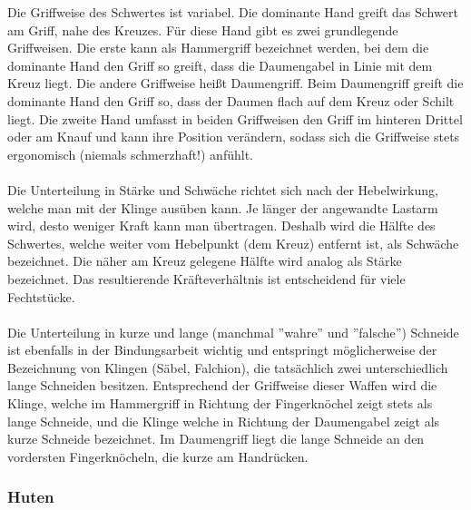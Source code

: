 Die Griffweise des Schwertes ist variabel.
Die dominante Hand greift das Schwert am Griff, nahe des Kreuzes.
Für diese Hand gibt es zwei grundlegende Griffweisen.
Die erste kann als Hammergriff bezeichnet werden, bei dem die dominante Hand den Griff so greift, dass die Daumengabel in Linie mit dem Kreuz liegt.
Die andere Griffweise heißt Daumengriff.
Beim Daumengriff greift die dominante Hand den Griff so, dass der Daumen flach auf dem Kreuz oder Schilt liegt.
Die zweite Hand umfasst in beiden Griffweisen den Griff im hinteren Drittel oder am Knauf und kann ihre Position verändern, sodass sich die Griffweise stets ergonomisch (niemals schmerzhaft!) anfühlt.
\\
\\
Die Unterteilung in Stärke und Schwäche richtet sich nach der Hebelwirkung, welche man mit der Klinge ausüben kann.
Je länger der angewandte Lastarm wird, desto weniger Kraft kann man übertragen.
Deshalb wird die Hälfte des Schwertes, welche weiter vom Hebelpunkt (dem Kreuz) entfernt ist, als Schwäche bezeichnet.
Die näher am Kreuz gelegene Hälfte wird analog als Stärke bezeichnet.
Das resultierende Kräfteverhältnis ist entscheidend für viele Fechtstücke.
\\
\\
Die Unterteilung in kurze und lange (manchmal ''wahre'' und ''falsche'') Schneide ist ebenfalls in der Bindungsarbeit wichtig und entspringt möglicherweise der Bezeichnung von Klingen (Säbel, Falchion), die tatsächlich zwei unterschiedlich lange Schneiden besitzen.
Entsprechend der Griffweise dieser Waffen wird die Klinge, welche im Hammergriff in Richtung der Fingerknöchel zeigt stets als lange Schneide, und die Klinge welche in Richtung der Daumengabel zeigt als kurze Schneide bezeichnet.
Im Daumengriff liegt die lange Schneide an den vordersten Fingerknöcheln, die kurze am Handrücken.

\subsubsection{Huten}

